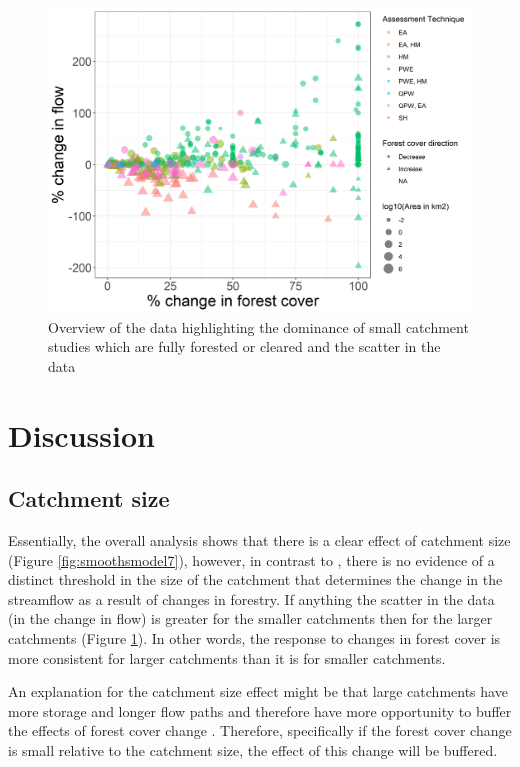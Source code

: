 \documentclass[]{elsarticle} %
\begin{document}
\begin{figure}
\includegraphics[width=0.9\linewidth]{flow_forest_byArea} \caption{Overview of the data highlighting the dominance of small catchment studies which are fully forested or cleared and the scatter in the data}\label{fig:overview}
\end{figure}

\hypertarget{discussion}{%
\section{Discussion}\label{discussion}}

\hypertarget{catchment-size}{%
\subsection{Catchment size}\label{catchment-size}}

Essentially, the overall analysis shows that there is a clear effect of catchment size (Figure \ref{fig:smoothsmodel7}), however, in contrast to \citet{zhang2017}, there is no evidence of a distinct threshold in the size of the catchment that determines the change in the streamflow as a result of changes in forestry. If anything the scatter in the data (in the change in flow) is greater for the smaller catchments then for the larger catchments (Figure \ref{fig:overview}). In other words, the response to changes in forest cover is more consistent for larger catchments than it is for smaller catchments.

An explanation for the catchment size effect might be that large catchments have more storage and longer flow paths and therefore have more opportunity to buffer the effects of forest cover change \citep{navas2019}. Therefore, specifically if the forest cover change is small relative to the catchment size, the effect of this change will be buffered.
\end{document}
